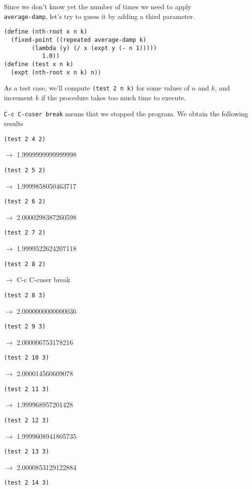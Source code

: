 \documentclass[a4paper,12pt]{article}
\begin{document}
Since we don't know yet the number of times we need to apply \\
\lstinline!average-damp!, let's try to guess it by adding a third
parameter.
\begin{lstlisting}
(define (nth-root x n k)
  (fixed-point ((repeated average-damp k)
		(lambda (y) (/ x (expt y (- n 1)))))
	       1.0))
(define (test x n k)
  (expt (nth-root x n k) n))
\end{lstlisting}
As a test case, we'll compute \lstinline!(test 2 n k)! for some
values of $n$ and $k$, and increment $k$ if the procedure takes too
much time to execute.  

\lstinline!C-c C-cuser break! means that we
stopped the program.  We obtain the following results
\begin{lstlisting}
(test 2 4 2)
\end{lstlisting}
$\rightarrow$ 1.9999999999999998
\begin{lstlisting}
(test 2 5 2)
\end{lstlisting}
$\rightarrow$ 1.9999858050463717
\begin{lstlisting}
(test 2 6 2)
\end{lstlisting}
$\rightarrow$ 2.0000298387260598
\begin{lstlisting}
(test 2 7 2)
\end{lstlisting}
$\rightarrow$ 1.9999522624207118
\begin{lstlisting}
(test 2 8 2)
\end{lstlisting}
$\rightarrow$   C-c C-cuser break
\begin{lstlisting}
(test 2 8 3)
\end{lstlisting}
$\rightarrow$ 2.0000000000000036
\begin{lstlisting}
(test 2 9 3)
\end{lstlisting}
$\rightarrow$ 2.000006753178216
\begin{lstlisting}
(test 2 10 3)
\end{lstlisting}
$\rightarrow$ 2.000014560609078
\begin{lstlisting}
(test 2 11 3)
\end{lstlisting}
$\rightarrow$ 1.999968957201428
\begin{lstlisting}
(test 2 12 3)
\end{lstlisting}
$\rightarrow$ 1.9999608941805735
\begin{lstlisting}
(test 2 13 3)
\end{lstlisting}
$\rightarrow$ 2.0000853129122884
\begin{lstlisting}
(test 2 14 3)
\end{lstlisting}
\end{document}
